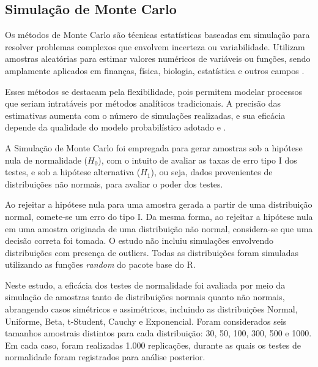 \documentclass[a4paper,11pt]{article} %
\begin{document}
\subsection{Simulação de Monte Carlo} %

Os métodos de Monte Carlo são técnicas estatísticas baseadas em simulação para resolver problemas complexos que envolvem incerteza ou variabilidade. Utilizam amostras aleatórias para estimar valores numéricos de variáveis ou funções, sendo amplamente aplicados em finanças, física, biologia, estatística e outros campos \cite{metropolis1949monte}. 

\vspace{0.5cm}

Esses métodos se destacam pela flexibilidade, pois permitem modelar processos que seriam intratáveis por métodos analíticos tradicionais. A precisão das estimativas aumenta com o número de simulações realizadas, e sua eficácia depende da qualidade do modelo probabilístico adotado \cite{carlo2001monte} e \cite{rubinstein2016simulation}.

\vspace{0.5cm}

A Simulação de Monte Carlo foi empregada para gerar amostras sob a hipótese nula de normalidade ($H_0$), com o intuito de avaliar as taxas de erro tipo I dos testes, e sob a hipótese alternativa ($H_1$), ou seja, dados provenientes de distribuições não normais, para avaliar o poder dos testes.

\vspace{0.5cm}

Ao rejeitar a hipótese nula para uma amostra gerada a partir de uma distribuição normal, comete-se um erro do tipo I. Da mesma forma, ao rejeitar a hipótese nula em uma amostra originada de uma distribuição não normal, considera-se que uma decisão correta foi tomada. O estudo não incluiu simulações envolvendo distribuições com presença de outliers. Todas as distribuições foram simuladas utilizando as funções \textit{random} do pacote base do R.

\vspace{0.5cm}

Neste estudo, a eficácia dos testes de normalidade foi avaliada por meio da simulação de amostras tanto de distribuições normais quanto não normais, abrangendo casos simétricos e assimétricos, incluindo as distribuições Normal, Uniforme, Beta, t-Student, Cauchy e Exponencial. Foram considerados seis tamanhos amostrais distintos para cada distribuição: 30, 50, 100, 300, 500 e 1000. Em cada caso, foram realizadas 1.000 replicações, durante as quais os testes de normalidade foram registrados para análise posterior.
\end{document}
